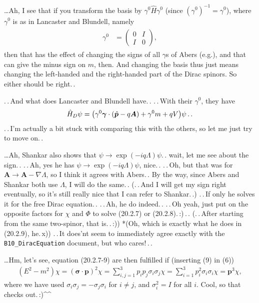 \documentclass{report}
\newcommand{\bsacc}[3]{#1{\boldsymbol{#2}\hspace{#3em}}\hspace{-#3em}}
\newcommand{\hatbsp}{{\bsacc{\hat}{p}{.15}}}
\begin{document}
\ldots Ah, I see that if you transform the basis by $\gamma^0 \hat H \gamma^0$ (since $(\gamma^0)^{-1}=\gamma^0$), where $\gamma^0$ is as in Lancaster and Blundell, namely
\begin{align}
\begin{aligned}
	\gamma^0 &=
		\begin{pmatrix}
		0 & 					I \\
		I & 					0
		\end{pmatrix},
\end{aligned}
\end{align}
then that has the effect of changing the signs of all $\gamma$s of Abers (e.g.), and that can give the minus sign on $m$, then. And changing the basis thus just means changing the left-handed and the right-handed part of the Dirac spinors. So either should be right.\,. 

.\,.\,And what does Lancaster and Blundell have.\,. .\,.\,With their $\gamma^0$, they have
\begin{align}
	\hat H_{D} \psi = \big(
		\gamma^0 \boldsymbol \gamma \cdot (\hatbsp - q \boldsymbol A) +
		\gamma^0 m + 
		q V
	\big)\psi\,.\,.
\end{align}
.\,.\,I'm actually a bit stuck with comparing this with the others, so let me just try to move on.\,. 

\ldots Ah, Shankar also shows that $\psi \to \exp(-i q \Lambda) \psi$.\,. wait, let me see about the sign.\,. .\,.\,Ah, yes he has $\psi \to \exp(-i q \Lambda) \psi$, nice.\,. .\,.\,Oh, but that was for $\boldsymbol{A}\to \boldsymbol{A} - \nabla \Lambda$, so I think it agrees with Abers.\,. By the way, since Abers and Shankar both use $\Lambda$, I will do the same.\,. (.\,.\,And I will get my sign right eventually, so it's still really nice that I can refer to Shankar.\,.) .\,.\,If only he solves it for the free Dirac equation.\,. .\,.\,Ah, he do indeed.\,. .\,.\,Oh yeah, just put on the opposite factors for $\chi$ and $\Phi$ to solve (20.2.7) or (20.2.8).\,:)\,.\,. (.\,.\,After starting from the same two-spinor, that is.\,.\,:)) *(Oh, which is exactly what he does in (20.2.9), he.\,x)) .\,.\,It does'nt seem to immediately agree exactly with the \texttt{B10\_DiracEquation} document, but who cares!\,.\,. 

\ldots Hm, let's see, equation (20.2.7-9) are then fulfilled if (inserting (9) in (6))
\begin{align}
	(E^2 - m^2 )\chi = (\boldsymbol{\sigma} \cdot \boldsymbol{p})^2\chi
		= \sum_{i, j = 1}^3 p_i p_j \sigma_i\sigma_j \chi
		= \sum_{i = 1}^3 p_i^2 \sigma_i\sigma_i \chi
		= \boldsymbol{p}^3 \chi,
\end{align}
where we have used $\sigma_i \sigma_j = - \sigma_j \sigma_i$ for $i\neq j$, and $\sigma_i^2 = I$ for all $i$. Cool, so that checks out.\,:)\textasciicircum\textasciicircum\ %
\end{document}
